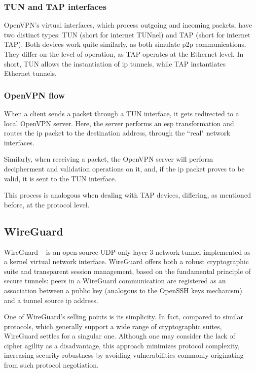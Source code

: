 \documentclass[11pt,twoside,a4paper]{report}
\begin{document}
\subsubsection{TUN and TAP interfaces}

OpenVPN's virtual interfaces, which process outgoing and incoming packets, have two distinct types: TUN (short for internet TUNnel) and TAP (short for internet TAP). Both devices work quite similarly, as both simulate \ac{p2p} communications. They differ on the level of operation, as TAP operates at the Ethernet level. In short, TUN allows the instantiation of \ac{ip} tunnels, while TAP instantiates Ethernet tunnels.

\subsubsection{OpenVPN flow}

When a client sends a packet through a TUN interface, it gets redirected to a local OpenVPN server. Here, the server performs an \ac{esp} transformation and routes the \ac{ip} packet to the destination address, through the ``real" network interfaces.

Similarly, when receiving a packet, the OpenVPN server will perform decipherment and validation operations on it, and, if the \ac{ip} packet proves to be valid, it is sent to the TUN interface.

This process is analogous when dealing with TAP devices, differing, as mentioned before, at the protocol level.

\subsection{WireGuard}

WireGuard ~\cite{donenfeld2017wireguard} is an open-source UDP-only layer 3 network tunnel implemented as a kernel virtual network interface. WireGuard offers both a robust cryptographic suite and transparent session management, based on the fundamental principle of secure tunnels: peers in a WireGuard communication are registered as an association between a public key (analogous to the OpenSSH keys mechanism) and a tunnel source \ac{ip} address.

One of WireGuard's selling points is its simplicity. In fact, compared to similar protocols, which generally support a wide range of cryptographic suites, WireGuard settles for a singular one. Although one may consider the lack of cipher agility as a disadvantage, this approach minimizes protocol complexity, increasing security robustness by avoiding vulnerabilities commonly originating from such protocol negotiation.
\end{document}
